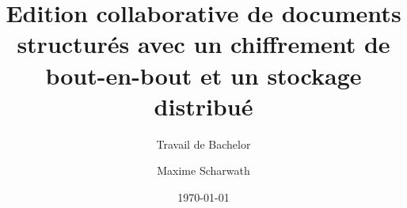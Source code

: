 \author{Maxime Scharwath}


\title{Edition collaborative de documents structurés avec un chiffrement de bout-en-bout et un stockage distribué}

\subtitle{Travail de Bachelor}


\date{\today}



